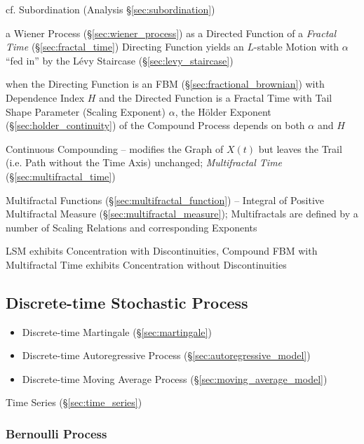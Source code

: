 \fist cf. Subordination (Analysis \S\ref{sec:subordination})

a Wiener Process (\S\ref{sec:wiener_process}) as a Directed Function of a
\emph{Fractal Time} (\S\ref{sec:fractal_time}) Directing Function yields an
$L$-stable Motion with $\alpha$ ``fed in'' by the L\'evy Staircase
(\S\ref{sec:levy_staircase})

when the Directing Function is an FBM (\S\ref{sec:fractional_brownian}) with
Dependence Index $H$ and the Directed Function is a Fractal Time with Tail Shape
Parameter (Scaling Exponent) $\alpha$, the H\"older Exponent
(\S\ref{sec:holder_continuity}) of the Compound Process depends on both $\alpha$
and $H$

Continuous Compounding -- modifies the Graph of $X(t)$ but leaves the Trail
(i.e. Path without the Time Axis) unchanged; \emph{Multifractal Time}
(\S\ref{sec:multifractal_time})

Multifractal Functions (\S\ref{sec:multifractal_function}) -- Integral of
Positive Multifractal Measure (\S\ref{sec:multifractal_measure}); Multifractals
are defined by a number of Scaling Relations and corresponding Exponents

LSM exhibits Concentration with Discontinuities, Compound FBM with Multifractal
Time exhibits Concentration without Discontinuities



\subsection{Discrete-time Stochastic Process}\label{sec:discretetime_stochastic}

\begin{itemize}
  \item Discrete-time Martingale (\S\ref{sec:martingale})
  \item Discrete-time Autoregressive Process (\S\ref{sec:autoregressive_model})
  \item Discrete-time Moving Average Process (\S\ref{sec:moving_average_model})
\end{itemize}

\fist Time Series (\S\ref{sec:time_series})




\subsubsection{Bernoulli Process}\label{sec:bernoulli_process}

